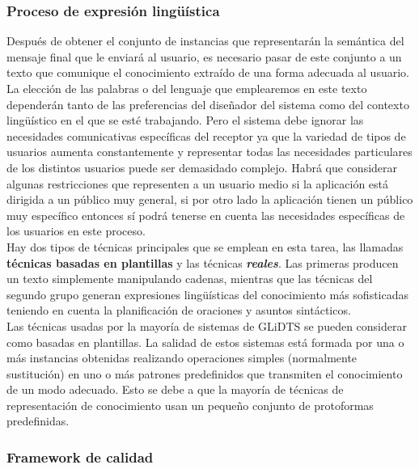 \documentclass[10pt,a4paper]{article}
\begin{document}
\subsubsection{Proceso de expresión lingüística}

Después de obtener el conjunto de instancias que representarán la semántica del mensaje final que le enviará al usuario, es necesario pasar de este conjunto a un texto que comunique el conocimiento extraído de una forma adecuada al usuario.\\

La elección de las palabras o del lenguaje que emplearemos en este texto dependerán tanto de las preferencias del diseñador del sistema como del contexto lingüístico en el que se esté trabajando. Pero el sistema debe ignorar las necesidades comunicativas específicas del receptor ya que la variedad de tipos de usuarios aumenta constantemente y representar todas las necesidades particulares de los distintos usuarios puede ser demasidado complejo. Habrá que considerar algunas restricciones que representen a un usuario medio si la aplicación está dirigida a un público muy general, si por otro lado la aplicación tienen un público muy específico entonces sí podrá tenerse en cuenta las necesidades específicas de los usuarios en este proceso.\\

Hay dos tipos de técnicas principales que se emplean en esta tarea, las llamadas \textbf{técnicas basadas en plantillas} y las técnicas \textbf{\textit{reales}}. Las primeras producen un texto simplemente manipulando cadenas, mientras que las técnicas del segundo grupo generan expresiones lingüísticas del conocimiento más sofisticadas teniendo en cuenta la planificación de oraciones y asuntos sintácticos.\\

Las técnicas usadas por la mayoría de sistemas de GLiDTS se pueden considerar como basadas en plantillas. La salidad de estos sistemas está formada por una o más instancias obtenidas realizando operaciones simples (normalmente sustitución) en uno o más patrones predefinidos que transmiten el conocimiento de un modo adecuado. Esto se debe a que la mayoría de técnicas de representación de conocimiento usan un pequeño conjunto de protoformas predefinidas.

\subsubsection{Framework de calidad}
\end{document}
